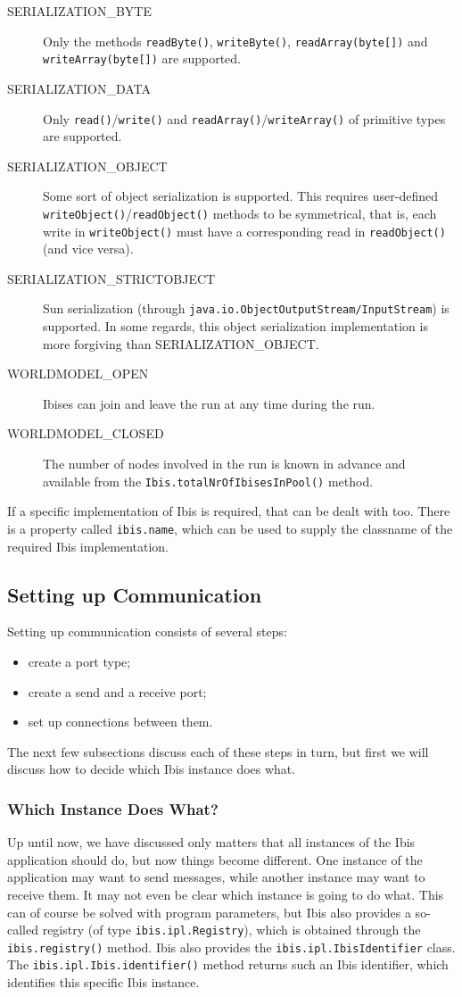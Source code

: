 \documentclass[10pt]{article}
\newcommand{\mysubsubsection}[1]{\subsubsection{#1}\label{#1}}
\begin{document}
\begin{description}
\item[SERIALIZATION_BYTE]
Only the methods \texttt{readByte()}, \texttt{writeByte()}, \texttt{readArray(byte[])} and \texttt{writeArray(byte[])} are supported.
\item[SERIALIZATION_DATA]
Only \texttt{read()}/\texttt{write()} and \texttt{readArray()}/\texttt{writeArray()} of primitive types are supported.
\item[SERIALIZATION_OBJECT]
Some sort of object serialization is supported.
This requires user-defined
\texttt{writeObject()}/\texttt{readObject()} methods to be symmetrical, that is,
each write in \texttt{writeObject()} must have a corresponding read
in \texttt{readObject()} (and vice versa).
\item[SERIALIZATION_STRICTOBJECT]
Sun serialization (through \texttt{java.io.ObjectOutputStream/InputStream}) is
supported. In some regards, this object serialization implementation is more
forgiving than SERIALIZATION_OBJECT.
\item[WORLDMODEL_OPEN]
Ibises can join and leave the run at any time during the run.
\item[WORLDMODEL_CLOSED]
The number of nodes involved in the run is known in advance and
available from the \texttt{Ibis.totalNrOfIbisesInPool()} method.
\end{description}

\noindent
If a specific implementation of Ibis is required, that can be dealt with too.
There is a property called \texttt{ibis.name}, which can be used to supply the
classname of the required Ibis implementation.

\subsection{Setting up Communication}

Setting up communication consists of several steps:
\begin{itemize}
\item
create a port type;
\item
create a send and a receive port;
\item
set up connections between them.
\end{itemize}

\noindent
The next few subsections discuss each of these steps in turn, but
first we will discuss how to decide which Ibis instance does what.

\mysubsubsection{Which Instance Does What?}

Up until now, we have discussed only matters that all instances of
the Ibis application should do, but now things become different.
One instance of the application may want to send messages, while
another instance may want to receive them.
It may not even be clear which instance is going to do what.
This can of course be solved with program parameters, but Ibis
also provides a so-called registry (of type
\texttt{ibis.ipl.Registry}), which is obtained through the
\texttt{ibis.registry()} method.
Ibis also provides the \texttt{ibis.ipl.IbisIdentifier} class.
The \texttt{ibis.ipl.Ibis.identifier()} method returns such an
Ibis identifier, which identifies this specific Ibis instance.
\end{document}
